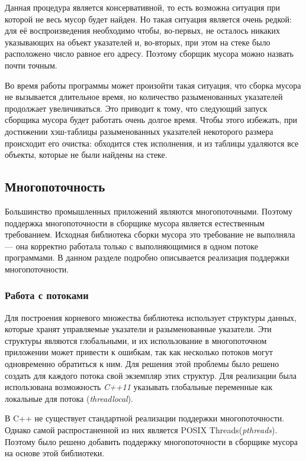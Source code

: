 \documentclass[14pt]{matmex-diploma}
\begin{document}
Данная процедура является консервативной, то есть возможна ситуация при которой не весь мусор будет найден. Но такая ситуация является очень редкой: для её воспроизведения необходимо чтобы, во-первых, не осталось никаких указывающих на объект указателей и, во-вторых, при этом на стеке было расположено число равное его адресу. Поэтому сборщик мусора можно назвать почти точным.

Во время работы программы может произойти такая ситуация, что сборка мусора не вызывается длительное время, но количество разыменованных указателей продолжает увеличиваться. Это приводит к тому, что следующий запуск сборщика мусора будет работать очень долгое время. Чтобы этого избежать, при достижении хэш-таблицы разыменованных указателей некоторого размера происходит его очистка: обходится стек исполнения, и из таблицы удаляются все объекты, которые не были найдены на стеке.
\subsection{Многопоточность}
Большинство промышленных приложений являются многопоточными. Поэтому поддержка многопоточности в сборщике мусора является естественным требованием. Исходная библиотека сборки мусора это требование не выполняла --- она корректно работала только с выполняющимися в одном потоке программами. В данном разделе подробно описывается реализация поддержки многопоточности.

\subsubsection{Работа с потоками}
Для построения корневого множества библиотека использует структуры данных, которые
хранят управляемые указатели и разыменованные указатели. Эти структуры являются глобальными, и их использование в многопоточном приложении может привести к ошибкам, так как несколько потоков могут одновременно обратиться к ним.
Для решения этой проблемы было решено создать для каждого потока свой экземпляр этих структур. Для реализации была использована возможность \textit{C++11} указывать
глобальные переменные как локальные для потока (\textit{threadlocal}).

В C++ не существует стандартной реализации поддержки многопоточности. 
Однако самой распростаненной из них является POSIX Threads(\textit{pthreads})\cite{pthreads}. Поэтому было решено добавить поддержку многопоточности в сборщике мусора на основе этой библиотеки.
\end{document}
